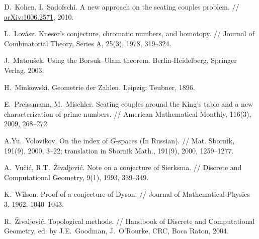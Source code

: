 \documentclass[12pt,a4paper]{amsart}
\theoremstyle{definition}
\theoremstyle{remark}
\begin{document}
\begin{thebibliography}{99}
D.~Kohen, I.~Sadofschi. A new approach on the seating couples problem. // \href{http://arxiv.org/abs/1006.2571}{arXiv:1006.2571}, 2010.

L.~Lov\'asz. Kneser's conjecture, chromatic numbers, and homotopy. // Journal of Combinatorial Theory, Series A, 25(3), 1978, 319--324.

J.~Matou\v{s}ek. Using the Borsuk--Ulam theorem. Berlin-Heidelberg, Springer Verlag, 2003.

H.~Minkowski. Geometrie der Zahlen. Leipzig: Teubner, 1896.

E.~Preissmann, M.~Mischler. Seating couples around the King's table and a new characterization of prime numbers. // American Mathematical Monthly, 116(3), 2009, 268--272.

A.Yu.~Volovikov. On the index of $G$-spaces (In Russian). // Mat. Sbornik, 191(9), 2000, 3--22; translation in Sbornik Math., 191(9), 2000, 1259--1277.

A.~Vu\v ci\'c, R.T.~\v Zivaljevi\'c. Note on a conjecture of Sierksma. // Discrete and Computational Geometry, 9(1), 1993, 339--349.

K.~Wilson. Proof of a conjecture of Dyson. // Journal of Mathematical Physics 3, 1962, 1040--1043.

R.~\v Zivaljevi\'c. Topological methods. // Handbook of Discrete and Computational Geometry, ed. by J.E.~Goodman, J.~O'Rourke, CRC, Boca Raton, 2004.
\end{thebibliography}
\end{document}
